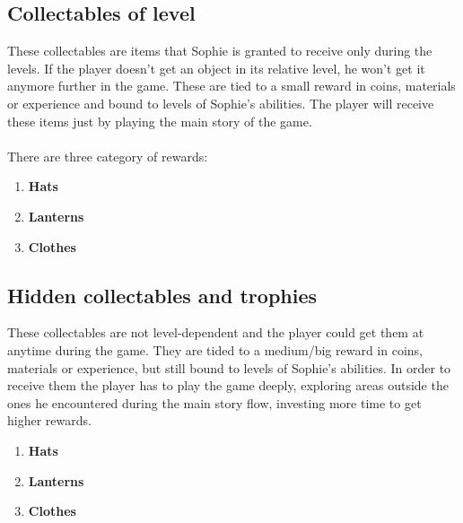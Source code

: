 \subsection{Collectables of level}
These collectables are items that Sophie is granted to receive only during the levels. If the player doesn't get an object in its relative level, he won't get it anymore further in the game.
These are tied to a small reward in coins, materials or experience and bound to levels of Sophie's abilities.
The player will receive these items just by playing the main story of the game.\\\\
There are three category of rewards:
\begin{enumerate}
\item \textbf{Hats}\\
  
\item \textbf{Lanterns}\\
  
\item \textbf{Clothes}\\
  
\end{enumerate}


\subsection{Hidden collectables and trophies}
These collectables are not level-dependent and the player could get them at anytime during the game. They are tided to a medium/big reward in coins, materials or experience, but still bound to levels of Sophie's abilities. In order to receive them the player has to play the game deeply, exploring areas outside the ones he encountered during the main story flow, investing more time to get higher rewards.
\begin{enumerate}
\item \textbf{Hats}\\
  
\item \textbf{Lanterns}\\
  
\item \textbf{Clothes}\\
  
\end{enumerate}


